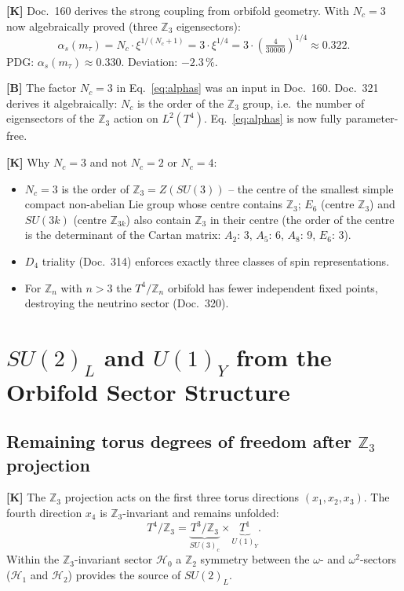 \textbf{[K]} Doc.~160 derives the strong coupling from orbifold geometry.
With $N_c=3$ now algebraically proved (three $\mathbb{Z}_3$ eigensectors):
\begin{equation}
  \alpha_s(m_\tau) = N_c\cdot\xi^{1/(N_c+1)}
  = 3\cdot\xi^{1/4}
  = 3\cdot\!\left(\tfrac{4}{30000}\right)^{1/4}
  \approx 0.322.
  \label{eq:alphas}
\end{equation}
PDG: $\alpha_s(m_\tau)\approx0.330$. Deviation: $-2.3\,\%$.

\textbf{[B]} The factor $N_c=3$ in Eq.~\eqref{eq:alphas} was an input
in Doc.~160. Doc.~321 derives it algebraically: $N_c$ is the order of
the $\mathbb{Z}_3$ group, i.e.\ the number of eigensectors of the
$\mathbb{Z}_3$ action on $L^2(T^4)$. Eq.~\eqref{eq:alphas} is now
fully parameter-free.

\textbf{[K]} Why $N_c=3$ and not $N_c=2$ or $N_c=4$:
\begin{itemize}
  \item $N_c=3$ is the order of $\mathbb{Z}_3 = Z(SU(3))$ -- the
    centre of the smallest simple compact non-abelian Lie group whose
    centre contains $\mathbb{Z}_3$; $E_6$ (centre $\mathbb{Z}_3$) and
    $SU(3k)$ (centre $\mathbb{Z}_{3k}$) also contain $\mathbb{Z}_3$ in
    their centre (the order of the centre is the determinant of the
    Cartan matrix: $A_2$: 3, $A_5$: 6, $A_8$: 9, $E_6$: 3).
  \item $D_4$ triality (Doc.~314) enforces exactly three classes of
    spin representations.
  \item For $\mathbb{Z}_n$ with $n>3$ the $T^4/\mathbb{Z}_n$ orbifold
    has fewer independent fixed points, destroying the neutrino sector
    (Doc.~320).
\end{itemize}

\section{$SU(2)_L$ and $U(1)_Y$ from the Orbifold Sector Structure}

\subsection{Remaining torus degrees of freedom after $\mathbb{Z}_3$ projection}

\textbf{[K]} The $\mathbb{Z}_3$ projection acts on the first three
torus directions $(x_1,x_2,x_3)$. The fourth direction $x_4$ is
$\mathbb{Z}_3$-invariant and remains unfolded:
\begin{equation}
  T^4/\mathbb{Z}_3
  = \underbrace{T^3/\mathbb{Z}_3}_{SU(3)_c}
  \times \underbrace{T^1}_{U(1)_Y}.
\end{equation}
Within the $\mathbb{Z}_3$-invariant sector $\mathcal{H}_0$ a
$\mathbb{Z}_2$ symmetry between the $\omega$- and $\omega^2$-sectors
($\mathcal{H}_1$ and $\mathcal{H}_2$) provides the source of $SU(2)_L$.

